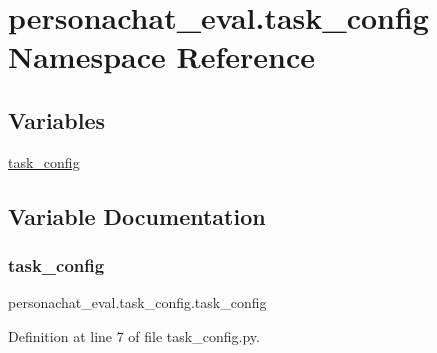 \hypertarget{namespacepersonachat__eval_1_1task__config}{}\section{personachat\+\_\+eval.\+task\+\_\+config Namespace Reference}
\label{namespacepersonachat__eval_1_1task__config}
\subsection*{Variables}
\begin{DoxyCompactItemize}
\item 
\hyperlink{namespacepersonachat__eval_1_1task__config_a9032831d688c5a24d6f7dc548395e66d}{task\+\_\+config}
\end{DoxyCompactItemize}


\subsection{Variable Documentation}
\mbox{\label{namespacepersonachat__eval_1_1task__config_a9032831d688c5a24d6f7dc548395e66d}} 
\subsubsection{\texorpdfstring{task\+\_\+config}{task\_config}}
{\footnotesize\ttfamily personachat\+\_\+eval.\+task\+\_\+config.\+task\+\_\+config}



Definition at line 7 of file task\+\_\+config.\+py.

